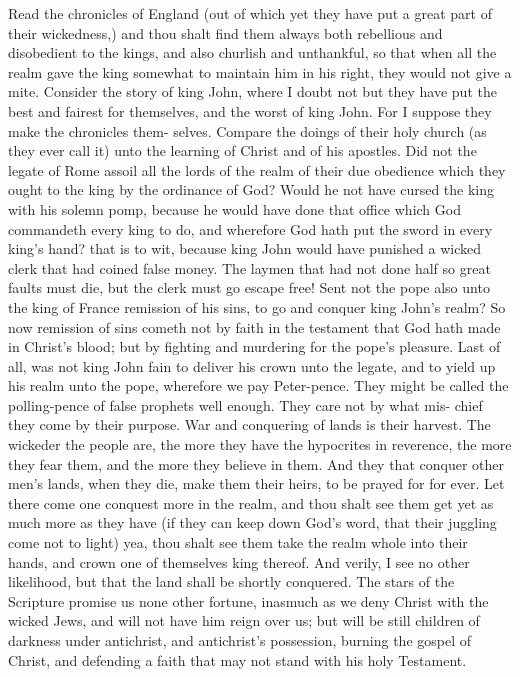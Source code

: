 \documentclass{custom}
\begin{document}
Read the chronicles of England (out of which yet they 
have put a great part of their wickedness,) and thou shalt 
find them always both rebellious and disobedient to the 
kings, and also churlish and unthankful, so that when all 
the realm gave the king somewhat to maintain him in his 
right, they would not give a mite. Consider the story 
of king John, where I doubt not but they have put the 
best and fairest for themselves, and the worst of king 
John. For I suppose they make the chronicles them- 
selves. Compare the doings of their holy church (as they 
ever call it) unto the learning of Christ and of his apostles. 
Did not the legate of Rome assoil all the lords of the 
realm of their due obedience which they ought to the 
king by the ordinance of God? Would he not have 
cursed the king with his solemn pomp, because he would 
have done that office which God commandeth every king 
to do, and wherefore God hath put the sword in every 
king's hand? that is to wit, because king John would 
have punished a wicked clerk that had coined false 
money. The laymen that had not done half so great 
faults must die, but the clerk must go escape free! Sent 
not the pope also unto the king of France remission of 
his sins, to go and conquer king John's realm? So now 
remission of sins cometh not by faith in the testament that 
God hath made in Christ's blood; but by fighting and 
murdering for the pope's pleasure. Last of all, was not 
king John fain to deliver his crown unto the legate, and 
to yield up his realm unto the pope, wherefore we pay 
Peter-pence. They might be called the polling-pence of 
false prophets well enough. They care not by what mis- 
chief they come by their purpose. War and conquering 
of lands is their harvest. The wickeder the people are, 
the more they have the hypocrites in reverence, the more 
they fear them, and the more they believe in them. And 
they that conquer other men's lands, when they die, make 
them their heirs, to be prayed for for ever. Let there come
one conquest more in the realm, and thou shalt see them
get yet as much more as they have (if they can keep down
God's word, that their juggling come not to light) yea,
thou shalt see them take the realm whole into their hands,
and crown one of themselves king thereof. And verily, 
I see no other likelihood, but that the land shall be shortly 
conquered. The stars of the Scripture promise us none 
other fortune, inasmuch as we deny Christ with the wicked 
Jews, and will not have him reign over us; but will be 
still children of darkness under antichrist, and antichrist's 
possession, burning the gospel of Christ, and defending 
a faith that may not stand with his holy Testament. 
\end{document}
